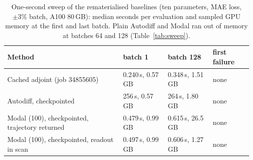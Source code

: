 \documentclass[a4paper,10pt]{article}
\begin{document}
\begin{table}[ht]
\centering\small
\begin{tabular}{llll}
\hline
Method & batch 1 & batch 128 & first failure \\
\hline
Cached adjoint (job 34855605) & 0.240\,s, 0.57\,GB & 0.348\,s, 1.51\,GB & none \\
Autodiff, checkpointed & 256\,s, 0.57\,GB & 264\,s, 1.80\,GB & none \\
Modal (100), checkpointed, trajectory returned & 0.479\,s, 0.99\,GB & 0.615\,s, 26.5\,GB & none \\
Modal (100), checkpointed, readout in scan & 0.497\,s, 0.99\,GB & 0.606\,s, 1.27\,GB & none \\
\hline
\end{tabular}
\caption{One-second sweep of the rematerialised baselines (ten parameters, MAE loss, $\pm3\%$ batch, A100 80\,GB): median seconds per evaluation and sampled GPU memory at the first and last batch. Plain Autodiff and Modal ran out of memory at batches 64 and 128 (Table~\ref{tab:sweep}).}
\label{tab:ckpt}
\end{table}



\end{document}
